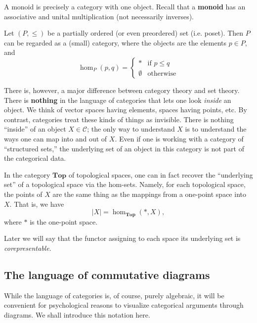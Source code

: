 \begin{example}
A monoid is precisely a category with one object. Recall that a \textbf{monoid}
has an associative and unital multiplication (not necessarily inverses).
\end{example}


\begin{example} \label{posetcategory} Let $(P, \leq)$ be a partially ordered
 (or even preordered) set (i.e. poset). Then $P$ can be regarded as a (small) category, where the objects are the elements
$p \in P$, and $$\hom_P(p, q) = \begin{cases} 
\ast & \text{if } p \leq q \\
\emptyset & \text{otherwise}
 \end{cases} $$
\end{example} 

There is, however, a major difference between category theory and set theory.
There is \textbf{nothing} in the language of categories that lets one look
\emph{inside} an object. We think of vector spaces having elements, spaces
having points, etc.
By contrast, categories treat these kinds of things as invisible. There
is nothing ``inside'' of an object $X \in \mathcal{C}$; the only way to
understand $X$ is
to understand the ways one can map into and out of $X$.
Even if one is working with  a category of ``structured sets,'' the underlying
set of an object in this category is not part of the categorical data.


\begin{example}
In the category $\mathbf{Top}$ of topological spaces, one can in fact recover the
``underlying set'' of a topological space via the hom-sets. Namely, for each
topological space, the points of $X$ are the same thing as the mappings from a
one-point space into $X$. 
That is, we have
\[ |X| = \hom_{\mathbf{Top}}(\ast, X),  \]
where $\ast$ is the one-point space.

Later we will say that the functor assigning to each
space its underlying set is \emph{corepresentable.}
\end{example}

\subsection{The language of commutative diagrams}

While the language of categories is, of course, purely algebraic, it will be
convenient for psychological reasons to visualize categorical arguments
through diagrams.
We shall introduce this notation here.

